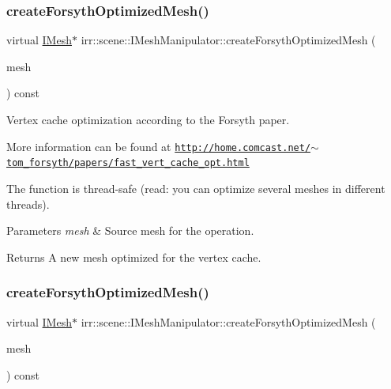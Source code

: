 \subsubsection{\texorpdfstring{create\+Forsyth\+Optimized\+Mesh()}{createForsythOptimizedMesh()}\hspace{0.1cm}{\footnotesize\ttfamily [1/2]}}
{\footnotesize\ttfamily virtual \hyperlink{classirr_1_1scene_1_1IMesh}{I\+Mesh}$\ast$ irr\+::scene\+::\+I\+Mesh\+Manipulator\+::create\+Forsyth\+Optimized\+Mesh (\begin{DoxyParamCaption}\item[{const \hyperlink{classirr_1_1scene_1_1IMesh}{I\+Mesh} $\ast$}]{mesh }\end{DoxyParamCaption}) const\hspace{0.3cm}{\ttfamily [pure virtual]}}



Vertex cache optimization according to the Forsyth paper. 

More information can be found at \href{http://home.comcast.net/~tom_forsyth/papers/fast_vert_cache_opt.html}{\tt http\+://home.\+comcast.\+net/$\sim$tom\+\_\+forsyth/papers/fast\+\_\+vert\+\_\+cache\+\_\+opt.\+html}

The function is thread-\/safe (read\+: you can optimize several meshes in different threads).


\begin{DoxyParams}{Parameters}
{\em mesh} & Source mesh for the operation. \\
\hline
\end{DoxyParams}
\begin{DoxyReturn}{Returns}
A new mesh optimized for the vertex cache. 
\end{DoxyReturn}
\mbox{\label{classirr_1_1scene_1_1IMeshManipulator_a5003ca5eabee96fe1c871bdb25ae43fd}} 
\subsubsection{\texorpdfstring{create\+Forsyth\+Optimized\+Mesh()}{createForsythOptimizedMesh()}\hspace{0.1cm}{\footnotesize\ttfamily [2/2]}}
{\footnotesize\ttfamily virtual \hyperlink{classirr_1_1scene_1_1IMesh}{I\+Mesh}$\ast$ irr\+::scene\+::\+I\+Mesh\+Manipulator\+::create\+Forsyth\+Optimized\+Mesh (\begin{DoxyParamCaption}\item[{const \hyperlink{classirr_1_1scene_1_1IMesh}{I\+Mesh} $\ast$}]{mesh }\end{DoxyParamCaption}) const\hspace{0.3cm}{\ttfamily [pure virtual]}}



